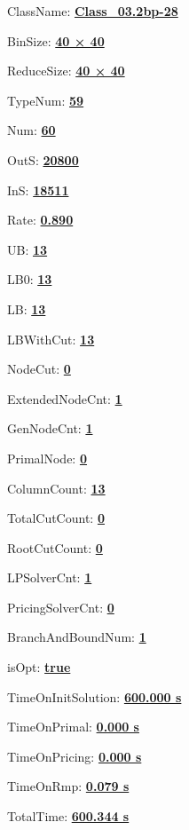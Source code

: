 \documentclass[11pt]{article}
\begin{document}
\pagestyle{empty}


ClassName: \underline{\textbf{Class_03.2bp-28}}
\par
BinSize: \underline{\textbf{40 × 40}}
\par
ReduceSize: \underline{\textbf{40 × 40}}
\par
TypeNum: \underline{\textbf{59}}
\par
Num: \underline{\textbf{60}}
\par
OutS: \underline{\textbf{20800}}
\par
InS: \underline{\textbf{18511}}
\par
Rate: \underline{\textbf{0.890}}
\par
UB: \underline{\textbf{13}}
\par
LB0: \underline{\textbf{13}}
\par
LB: \underline{\textbf{13}}
\par
LBWithCut: \underline{\textbf{13}}
\par
NodeCut: \underline{\textbf{0}}
\par
ExtendedNodeCnt: \underline{\textbf{1}}
\par
GenNodeCnt: \underline{\textbf{1}}
\par
PrimalNode: \underline{\textbf{0}}
\par
ColumnCount: \underline{\textbf{13}}
\par
TotalCutCount: \underline{\textbf{0}}
\par
RootCutCount: \underline{\textbf{0}}
\par
LPSolverCnt: \underline{\textbf{1}}
\par
PricingSolverCnt: \underline{\textbf{0}}
\par
BranchAndBoundNum: \underline{\textbf{1}}
\par
isOpt: \underline{\textbf{true}}
\par
TimeOnInitSolution: \underline{\textbf{600.000 s}}
\par
TimeOnPrimal: \underline{\textbf{0.000 s}}
\par
TimeOnPricing: \underline{\textbf{0.000 s}}
\par
TimeOnRmp: \underline{\textbf{0.079 s}}
\par
TotalTime: \underline{\textbf{600.344 s}}
\par
\newpage


\end{document}

